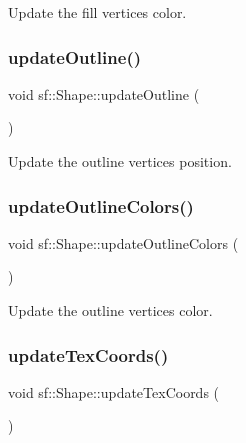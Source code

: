 Update the fill vertices\textquotesingle{} color. 

\begin{DoxyVerb}\end{DoxyVerb}
 \mbox{\label{classsf_1_1_shape_a1364b357a1041ff38c872871a5c28623}} 
\subsubsection{\texorpdfstring{updateOutline()}{updateOutline()}}
{\footnotesize\ttfamily void sf\+::\+Shape\+::update\+Outline (\begin{DoxyParamCaption}{ }\end{DoxyParamCaption})\hspace{0.3cm}{\ttfamily [private]}}



Update the outline vertices\textquotesingle{} position. 

\begin{DoxyVerb}\end{DoxyVerb}
 \mbox{\label{classsf_1_1_shape_a55d37129600d23db54d5b6cacb2d6d67}} 
\subsubsection{\texorpdfstring{updateOutlineColors()}{updateOutlineColors()}}
{\footnotesize\ttfamily void sf\+::\+Shape\+::update\+Outline\+Colors (\begin{DoxyParamCaption}{ }\end{DoxyParamCaption})\hspace{0.3cm}{\ttfamily [private]}}



Update the outline vertices\textquotesingle{} color. 

\begin{DoxyVerb}\end{DoxyVerb}
 \mbox{\label{classsf_1_1_shape_a4a7ea7b0254b26ac36c27a5ff545f4b3}} 
\subsubsection{\texorpdfstring{updateTexCoords()}{updateTexCoords()}}
{\footnotesize\ttfamily void sf\+::\+Shape\+::update\+Tex\+Coords (\begin{DoxyParamCaption}{ }\end{DoxyParamCaption})\hspace{0.3cm}{\ttfamily [private]}}



